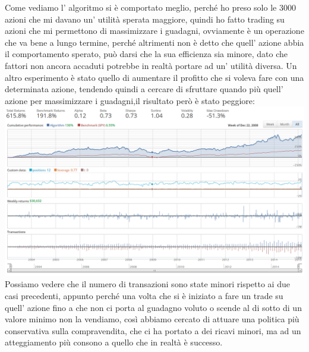 			Come vediamo l' algoritmo si è comportato meglio, perché ho preso solo le 3000 azioni che mi davano un' utilità sperata maggiore, quindi ho fatto trading su azioni che mi permettono di massimizzare i guadagni, ovviamente è un operazione che va bene a lungo termine, perché altrimenti non è detto che quell' azione abbia il comportamento sperato, può darsi che la sua efficienza sia minore, dato che fattori non ancora accaduti potrebbe in realtà portare ad un' utilità diversa.
			Un altro esperimento è stato quello di aumentare il profitto che si voleva fare con una determinata azione, tendendo quindi a cercare di sfruttare quando più quell' azione per massimizzare i guadagni,il risultato però è stato peggiore:
			\includegraphics[width=1.0\textwidth, height=0.40\textheight]{stock2.png} 
			Possiamo vedere che il numero di transazioni sono state minori rispetto ai due casi precedenti, appunto perché una volta che si è iniziato a fare un trade su quell' azione fino a che non ci porta al guadagno voluto o scende al di sotto di un valore minimo non la vendiamo, così abbiamo cercato di attuare una politica più conservativa sulla compravendita, che ci ha portato a dei ricavi minori, ma ad un atteggiamento più consono a quello che in realtà è successo.